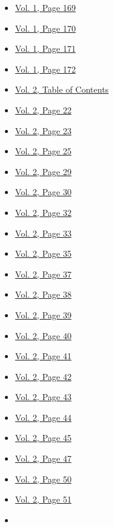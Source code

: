 \begin{itemize}
  \begin{itemize}
  \tightlist
  \item
    \protect\hyperlink{g-page-177}{Vol. 1, Page 169}
  \item
    \protect\hyperlink{g-page-178}{Vol. 1, Page 170}
  \item
    \protect\hyperlink{g-page-179}{Vol. 1, Page 171}
  \item
    \protect\hyperlink{g-page-180}{Vol. 1, Page 172}
  \item
    \protect\hyperlink{g-page-210}{Vol. 2, Table of Contents}
  \item
    \protect\hyperlink{g-page-234}{Vol. 2, Page 22}
  \item
    \protect\hyperlink{g-page-235}{Vol. 2, Page 23}
  \item
    \protect\hyperlink{g-page-237}{Vol. 2, Page 25}
  \item
    \protect\hyperlink{g-page-241}{Vol. 2, Page 29}
  \item
    \protect\hyperlink{g-page-242}{Vol. 2, Page 30}
  \item
    \protect\hyperlink{g-page-244}{Vol. 2, Page 32}
  \item
    \protect\hyperlink{g-page-245}{Vol. 2, Page 33}
  \item
    \protect\hyperlink{g-page-247}{Vol. 2, Page 35}
  \item
    \protect\hyperlink{g-page-249}{Vol. 2, Page 37}
  \item
    \protect\hyperlink{g-page-250}{Vol. 2, Page 38}
  \item
    \protect\hyperlink{g-page-251}{Vol. 2, Page 39}
  \item
    \protect\hyperlink{g-page-252}{Vol. 2, Page 40}
  \item
    \protect\hyperlink{g-page-253}{Vol. 2, Page 41}
  \item
    \protect\hyperlink{g-page-254}{Vol. 2, Page 42}
  \item
    \protect\hyperlink{g-page-255}{Vol. 2, Page 43}
  \item
    \protect\hyperlink{g-page-256}{Vol. 2, Page 44}
  \item
    \protect\hyperlink{g-page-257}{Vol. 2, Page 45}
  \item
    \protect\hyperlink{g-page-259}{Vol. 2, Page 47}
  \item
    \protect\hyperlink{g-page-262}{Vol. 2, Page 50}
  \item
    \protect\hyperlink{g-page-263}{Vol. 2, Page 51}
  \item

\end{itemize}
\end{itemize}
